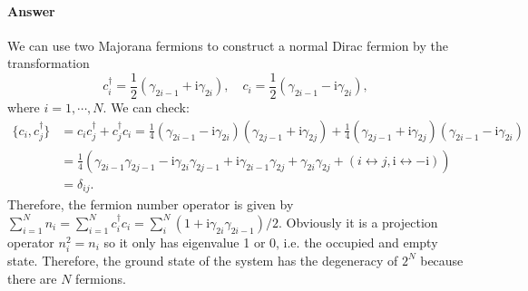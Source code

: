 \documentclass{book}
\begin{document}
\paragraph{Answer}
We can use two Majorana fermions to construct a normal Dirac fermion by the transformation
\begin{equation*}
c_{i}^{\dagger } =\frac{1}{2}( \gamma _{2i-1} +\mathrm{i} \gamma _{2i}) ,\quad c_{i} =\frac{1}{2}( \gamma _{2i-1} -\mathrm{i} \gamma _{2i}) ,
\end{equation*}
where $i=1,\cdots ,N$. We can check:
\begin{equation*}
\begin{aligned}
\{c_{i} ,c_{j}^{\dagger } \} & =c_{i} c_{j}^{\dagger } +c_{j}^{\dagger } c_{i} =\frac{1}{4}( \gamma _{2i-1} -\mathrm{i} \gamma _{2i})( \gamma _{2j-1} +\mathrm{i} \gamma _{2j}) +\frac{1}{4}( \gamma _{2j-1} +\mathrm{i} \gamma _{2j})( \gamma _{2i-1} -\mathrm{i} \gamma _{2i})\\
 & =\frac{1}{4}( \gamma _{2i-1} \gamma _{2j-1} -\mathrm{i} \gamma _{2i} \gamma _{2j-1} +\mathrm{i} \gamma _{2i-1} \gamma _{2j} +\gamma _{2i} \gamma _{2j} +( i\leftrightarrow j,\mathrm{i} \leftrightarrow -\mathrm{i}))\\
 & =\delta _{ij} .
\end{aligned}
\end{equation*}
Therefore, the fermion number operator is given by $\sum _{i=1}^{N} n_{i} =\sum _{i=1}^{N} c_{i}^{\dagger } c_{i} =\sum _{i}^{N}( 1+\mathrm{i} \gamma _{2i} \gamma _{2i-1}) /2$. Obviously it is a projection operator $n_{i}^{2} =n_{i}$ so it only has eigenvalue 1 or 0, i.e. the occupied and empty state. Therefore, the ground state of the system has the degeneracy of $2^{N}$ because there are $N$ fermions. 
\end{document}
